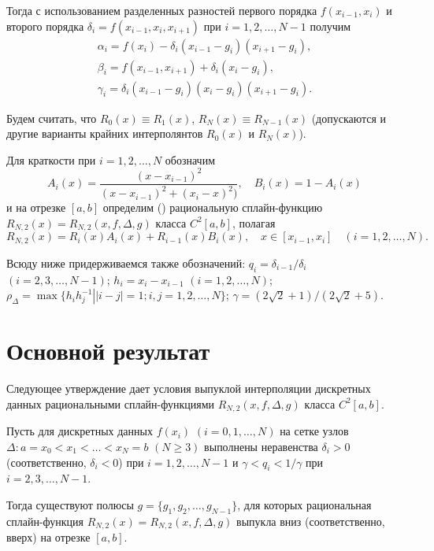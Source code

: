 Тогда с использованием разделенных разностей первого порядка $f(x_{i-1}, x_i)$ и второго порядка
$\delta_i=f(x_{i-1}, x_i, x_{i+1})$ при $i=1,2,\dots,N-1$ получим
\begin{equation*}
\begin{array}{l}
\alpha_i=f(x_i)-\delta_i(x_{i-1}-g_i)(x_{i+1}-g_i),\\[1ex]
\beta_i=f(x_{i-1}, x_{i+1})+\delta_i(x_i-g_i),\\[1ex]
\gamma_i=\delta_i(x_{i-1}-g_i)(x_i-g_i)(x_{i+1}-g_i).
\end{array}
\end{equation*}

Будем считать, что  $R_0(x)\equiv R_1(x)$, $R_N(x)\equiv R_{N-1}(x)$ (допускаются и другие варианты крайних интерполянтов
$R_0(x)$ и $R_N(x)$).

Для краткости при $i=1,2,\dots,N$ обозначим
\begin{equation*}
A_i(x)=\frac{(x-x_{i-1})^2}{(x-x_{i-1})^2+(x_i-x)^2)},\quad B_i(x)=1-A_i(x)
\end{equation*}
и на отрезке $[a,b]$ определим (\cite{ark-9}) рациональную сплайн-функцию
$R_{N,2}(x)=R_{N,2} (x, f, \Delta,g)$ класса $C^2[a,b]$, полагая
\begin{equation*}
R_{N,2}(x)=R_i(x) A_i(x)+R_{i-1}(x)B_i(x), \quad x\in [x_{i-1}, x_i]\quad (i=1,2,\dots,N).
\end{equation*}

Всюду ниже придерживаемся также обозначений:
$q_i=\delta_{i-1}/\delta_i$ $(i=2,3,\dots,N-1)$; $h_i=x_i-x_{i-1}$ $(i=1,2,\dots,N)$;
$\rho_\Delta=\max\{\left.h_ih_j^{-1}\right\vert |i-j|=1; i,j=1,2,\dots,N\}$;
$\gamma= (2\sqrt 2+1)/(2\sqrt 2+5)$.


\section{Основной результат}

Следующее утверждение дает условия выпуклой интерполяции дискретных данных рациональными
сплайн-функциями $R_{N,2}(x, f, \Delta, g)$ класса $C^2[a,b]$.

\begin{theorem}\label{ark-teor2.1}
Пусть для дискретных данных $f(x_i)$ $(i=0,1,\dots,N)$  на сетке узлов
$\Delta: a=x_0<x_1<\dots<x_N=b$ $(N\geqslant 3)$ выполнены неравенства $\delta_i>0$
(соответственно, $\delta_i<0$) при $i=1,2,\dots,N-1$ и $\gamma<q_i<1/\gamma$ при
$i=2,3,\dots,N-1$.

Тогда существуют полюсы  $g=\{g_1,g_2,\dots,g_{N-1}\}$, для которых рациональная сплайн-функция
$R_{N,2}(x)=R_{N,2} (x, f, \Delta,g)$ выпукла вниз (соответственно, вверх) на отрезке $[a,b]$.
\end{theorem}
